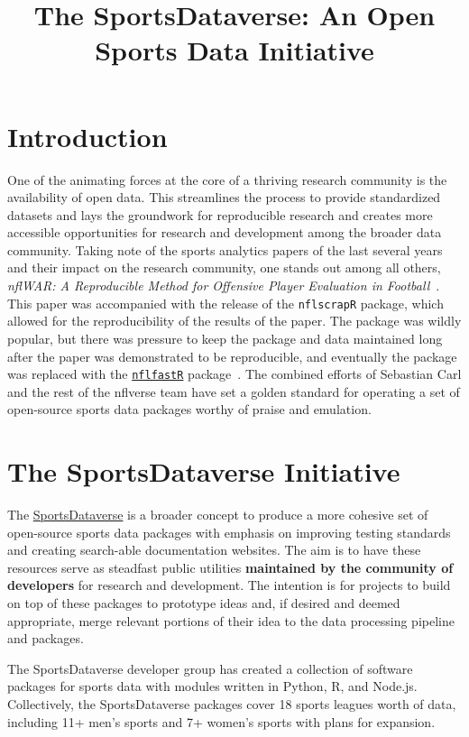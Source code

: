 \documentclass[12pt]{article}
\title{The SportsDataverse: An Open Sports Data Initiative}
\author{
}
\begin{document}
 \maketitle

\section{Introduction}
One of the animating forces at the core of a thriving research community is the availability of open data. This streamlines the process to provide standardized datasets and lays the groundwork for reproducible research and creates more accessible opportunities for research and development among the broader data community.  Taking note of the sports analytics papers of the last several years and their impact on the research community, one stands out among all others, \emph{nflWAR: A Reproducible Method for Offensive Player Evaluation in Football}~\cite{yurko_venturahorowitz_2019}. This paper was accompanied with the release of the \texttt{nflscrapR} package, which allowed for the reproducibility of the results of the paper. The package was wildly popular, but there was pressure to keep the package and data maintained long after the paper was demonstrated to be reproducible, and eventually the package was replaced with the \href{https://www.nflfastR.com}{\texttt{nflfastR}} package~\cite{Carl_Baldwin_2020}. The combined efforts of Sebastian Carl and the rest of the nflverse team have set a golden standard for operating a set of open-source sports data packages worthy of praise and emulation. 

\section{The SportsDataverse Initiative}
The \href{https://sportsdataverse.org}{SportsDataverse} is a broader concept to produce a more cohesive set of open-source sports data packages with emphasis on improving testing standards and creating search-able documentation websites. The aim is to have these resources serve as steadfast public utilities \textbf{maintained by the community of developers} for research and development. The intention is for projects to build on top of these packages to prototype ideas and, if desired and deemed appropriate, merge relevant portions of their idea to the data processing pipeline and packages.

The SportsDataverse developer group has created a collection of software packages for sports data with modules written in Python, R, and Node.js. Collectively, the SportsDataverse packages cover 18 sports leagues worth of data, including 11+ men's sports and 7+ women's sports with plans for expansion. 
\end{document}
